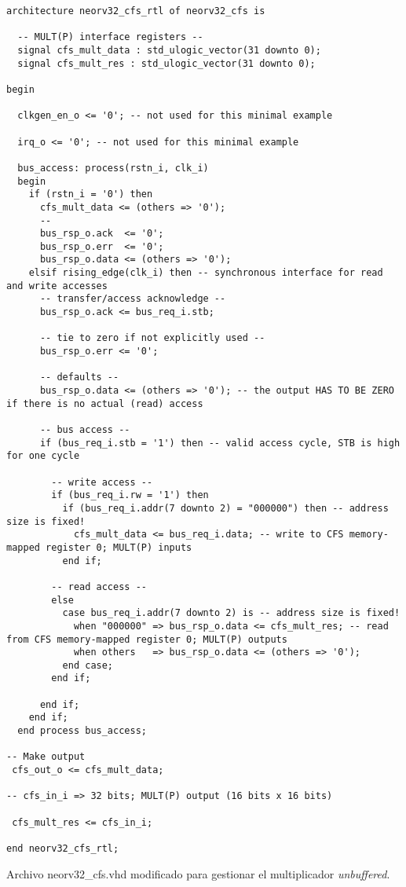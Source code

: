 \begin{code}
\begin{verbatim}
architecture neorv32_cfs_rtl of neorv32_cfs is

  -- MULT(P) interface registers --
  signal cfs_mult_data : std_ulogic_vector(31 downto 0);
  signal cfs_mult_res : std_ulogic_vector(31 downto 0);

begin

  clkgen_en_o <= '0'; -- not used for this minimal example

  irq_o <= '0'; -- not used for this minimal example

  bus_access: process(rstn_i, clk_i)
  begin
    if (rstn_i = '0') then
      cfs_mult_data <= (others => '0');
      --
      bus_rsp_o.ack  <= '0';
      bus_rsp_o.err  <= '0';
      bus_rsp_o.data <= (others => '0');
    elsif rising_edge(clk_i) then -- synchronous interface for read and write accesses
      -- transfer/access acknowledge --
      bus_rsp_o.ack <= bus_req_i.stb;

      -- tie to zero if not explicitly used --
      bus_rsp_o.err <= '0';

      -- defaults --
      bus_rsp_o.data <= (others => '0'); -- the output HAS TO BE ZERO if there is no actual (read) access

      -- bus access --
      if (bus_req_i.stb = '1') then -- valid access cycle, STB is high for one cycle

        -- write access --
        if (bus_req_i.rw = '1') then
          if (bus_req_i.addr(7 downto 2) = "000000") then -- address size is fixed!
            cfs_mult_data <= bus_req_i.data; -- write to CFS memory-mapped register 0; MULT(P) inputs
          end if;

        -- read access --
        else
          case bus_req_i.addr(7 downto 2) is -- address size is fixed!
            when "000000" => bus_rsp_o.data <= cfs_mult_res; -- read from CFS memory-mapped register 0; MULT(P) outputs
            when others   => bus_rsp_o.data <= (others => '0');
          end case;
        end if;

      end if;
    end if;
  end process bus_access;

-- Make output
 cfs_out_o <= cfs_mult_data; 

-- cfs_in_i => 32 bits; MULT(P) output (16 bits x 16 bits)

 cfs_mult_res <= cfs_in_i;

end neorv32_cfs_rtl;
\end{verbatim}
\caption{Archivo neorv32\_cfs.vhd modificado para gestionar el multiplicador \textit{unbuffered}.}
\label{ap-cod:18}
\end{code}

